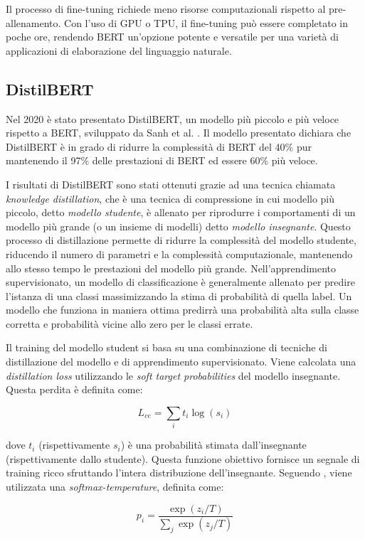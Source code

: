 \documentclass[../../Thesis.tex]{subfiles}
\begin{document}
Il processo di fine-tuning richiede meno risorse computazionali rispetto al pre-allenamento. Con l'uso di GPU o TPU, il fine-tuning può essere completato in poche ore, rendendo BERT un'opzione potente e versatile per una varietà di applicazioni di elaborazione del linguaggio naturale.

\subsection{DistilBERT}
Nel 2020 è stato presentato DistilBERT, un modello più piccolo e più veloce rispetto a BERT, sviluppato da Sanh et al. \cite{DistilBERT}. Il modello presentato dichiara che DistilBERT è in grado di ridurre la complessità di BERT del 40\% pur mantenendo il 97\% delle prestazioni di BERT ed essere 60\% più veloce. 

I risultati di DistilBERT sono stati ottenuti grazie ad una tecnica chiamata \emph{knowledge distillation}, che è una tecnica di compressione in cui modello più piccolo, detto \emph{modello studente}, è allenato per riprodurre i comportamenti di un modello più grande (o un insieme di modelli) detto \emph{modello insegnante}. Questo processo di distillazione permette di ridurre la complessità del modello studente, riducendo il numero di parametri e la complessità computazionale, mantenendo allo stesso tempo le prestazioni del modello più grande. Nell'apprendimento supervisionato, un modello di classificazione è generalmente allenato per predire l'istanza di una classi massimizzando la stima di probabilità di quella label. Un modello che funziona in maniera ottima predirrà una probabilità alta sulla classe corretta e probabilità vicine allo zero per le classi errate. 

Il training del modello student si basa su una combinazione di tecniche di distillazione del modello e di apprendimento supervisionato. Viene calcolata una  \textit{distillation loss} utilizzando le \textit{soft target probabilities} del modello insegnante. Questa perdita è definita come:

$$
L_{ce} = \sum_i t_i \log(s_i)
$$

dove $t_i$ (rispettivamente $s_i$) è una probabilità stimata dall'insegnante (rispettivamente dallo studente). Questa funzione obiettivo fornisce un segnale di training ricco sfruttando l'intera distribuzione dell'insegnante. Seguendo \cite{Hinton2015}, viene utilizzata una \textit{softmax-temperature}, definita come:

$$
p_i = \frac{\exp(z_i / T)}{\sum_j \exp(z_j / T)}
$$
\end{document}
